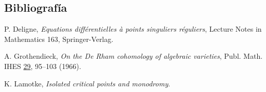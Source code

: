 \pageoriginale

\subsection*{Bibliografía}

\begin{enumerate}[label={[\arabic*]},leftmargin=3em]
\item P. Deligne, \emph{Equations diff\'erentielles \`a points
  singuliers r\'eguliers}, Lecture Notes in Mathematics 163,
  Springer-Verlag.
\item A. Grothendieck, \emph{On the De Rham cohomology of algebraic
  varieties}, Publ. Math. IHES \underline{29}, 95--103 (1966).
\item K. Lamotke, \emph{Isolated critical points and monodromy}.
\end{enumerate}
